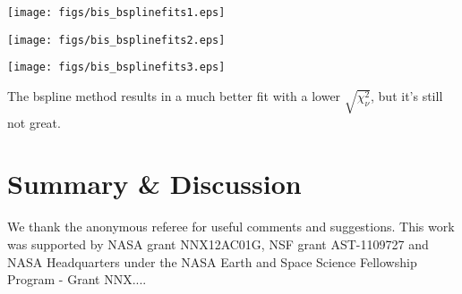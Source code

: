 \documentclass[iop]{emulateapj}
\def\chisq{$\sqrt{\chi_{\nu}^2}$}
\def\acenb{$\alpha$ Centauri B}
\begin{document}
\begin{figure*}[ht]
\texttt{[image: figs/bis\_bsplinefits1.eps]}
\caption{\label{fig:bis_bsplinefits1} The bisectors (black) and their respective bspline fits (red) for the first twelve chunks of a spectrum of \acenb.}
\end{figure*}

\begin{figure*}[ht]
\texttt{[image: figs/bis\_bsplinefits2.eps]}
\caption{\label{fig:bis_bsplinefits2} Same as Figure \ref{fig:bis_bsplinefits1}, but for the next twelve chunks.}
\end{figure*}

\begin{figure*}
\texttt{[image: figs/bis\_bsplinefits3.eps]}
\caption{\label{fig:bis_bsplinefits3} Same as Figure \ref{fig:bis_bsplinefits1}, but for the last twelve chunks.}
\end{figure*}

The bspline method results in a much better fit with a lower \chisq, but it's still not great. 

\section{Summary \& Discussion}
\label{sec:disc}

\acknowledgements
We thank the anonymous referee for useful comments and suggestions. This work was supported by NASA grant NNX12AC01G, NSF grant AST-1109727 and NASA  Headquarters under the NASA Earth and Space Science Fellowship Program - Grant NNX....







\clearpage

\clearpage
\end{document}
